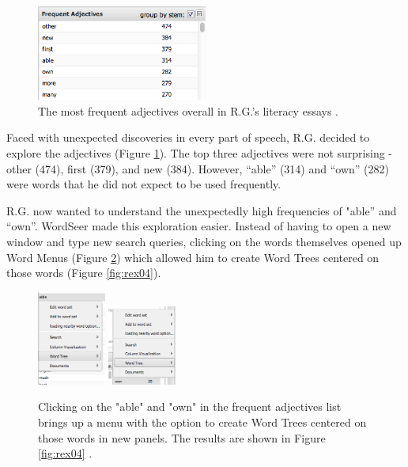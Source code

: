 \documentclass{sig-alternate}
\begin{document}
\begin{figure}
\includegraphics[width=0.5\textwidth]{fig/rex/02.png}
\caption{The most frequent adjectives overall in R.G.'s literacy essays \label{fig:rex02}.}
\end{figure}

Faced with unexpected discoveries in every part of speech, R.G. decided to explore the adjectives (Figure \ref{fig:rex02}). The top three adjectives were not surprising - other (474), first (379), and new (384).  However,  ``able'' (314) and ``own'' (282) were words that he did not expect to be used frequently.

R.G. now wanted to understand the unexpectedly high frequencies of "able'' and ``own''. WordSeer made this exploration easier. Instead of having to open a new window and type new search queries, clicking on the words themselves opened up Word Menus (Figure \ref{fig:rex03}) which allowed him to create Word Trees centered on those words (Figure \ref{fig:rex04}).   
\begin{figure}[h!]
\includegraphics[width=0.2\textwidth]{fig/rex/03.png}
\includegraphics[width=0.2\textwidth]{fig/rex/03b.png}
\caption{Clicking on the "able" and "own" in the frequent adjectives list brings up a menu with the option to create Word Trees centered on those words in new panels. The results are shown in Figure \ref{fig:rex04} \label{fig:rex03}.}
\end{figure}
\end{document}
